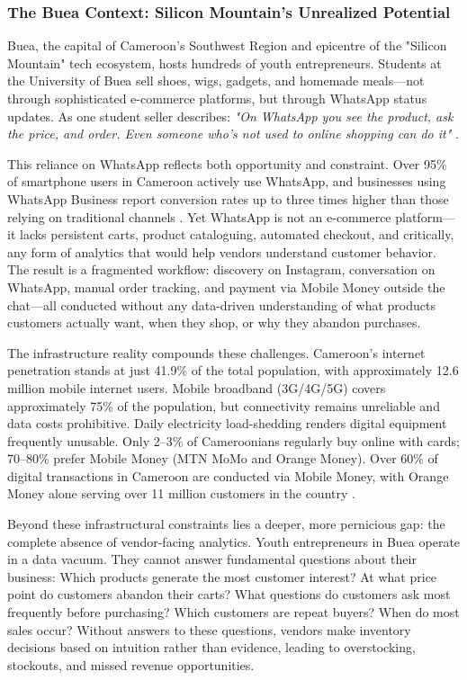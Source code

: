 \documentclass[12pt,a4paper]{article}
\begin{document}
\subsubsection{The Buea Context: Silicon Mountain's Unrealized Potential}

Buea, the capital of Cameroon's Southwest Region and epicentre of the "Silicon Mountain" tech ecosystem, hosts hundreds of youth entrepreneurs. Students at the University of Buea sell shoes, wigs, gadgets, and homemade meals---not through sophisticated e-commerce platforms, but through WhatsApp status updates. As one student seller describes: \textit{"On WhatsApp you see the product, ask the price, and order. Even someone who's not used to online shopping can do it"} \citep{geopoll2023}.

This reliance on WhatsApp reflects both opportunity and constraint. Over 95\% of smartphone users in Cameroon actively use WhatsApp, and businesses using WhatsApp Business report conversion rates up to three times higher than those relying on traditional channels \citep{geopoll2023}. Yet WhatsApp is not an e-commerce platform---it lacks persistent carts, product cataloguing, automated checkout, and critically, any form of analytics that would help vendors understand customer behavior. The result is a fragmented workflow: discovery on Instagram, conversation on WhatsApp, manual order tracking, and payment via Mobile Money outside the chat---all conducted without any data-driven understanding of what products customers actually want, when they shop, or why they abandon purchases.

The infrastructure reality compounds these challenges. Cameroon's internet penetration stands at just 41.9\% of the total population, with approximately 12.6 million mobile internet users. Mobile broadband (3G/4G/5G) covers approximately 75\% of the population, but connectivity remains unreliable and data costs prohibitive. Daily electricity load-shedding renders digital equipment frequently unusable. Only 2--3\% of Cameroonians regularly buy online with cards; 70--80\% prefer Mobile Money (MTN MoMo and Orange Money). Over 60\% of digital transactions in Cameroon are conducted via Mobile Money, with Orange Money alone serving over 11 million customers in the country \citep{nkeng2023, gsma2024}.

Beyond these infrastructural constraints lies a deeper, more pernicious gap: the complete absence of vendor-facing analytics. Youth entrepreneurs in Buea operate in a data vacuum. They cannot answer fundamental questions about their business: Which products generate the most customer interest? At what price point do customers abandon their carts? What questions do customers ask most frequently before purchasing? Which customers are repeat buyers? When do most sales occur? Without answers to these questions, vendors make inventory decisions based on intuition rather than evidence, leading to overstocking, stockouts, and missed revenue opportunities.
\end{document}
